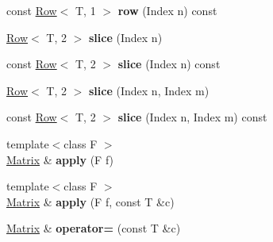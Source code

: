 \begin{DoxyCompactItemize}
\item 
const \hyperlink{classcpt_1_1Row}{Row}$<$ T, 1 $>$ {\bfseries row} (Index n) const \hypertarget{classcpt_1_1Matrix_3_01T_00_012_01_4_a0596d7c5a4bbe25667afb198df6a65f7}{}\label{classcpt_1_1Matrix_3_01T_00_012_01_4_a0596d7c5a4bbe25667afb198df6a65f7}

\item 
\hyperlink{classcpt_1_1Row}{Row}$<$ T, 2 $>$ {\bfseries slice} (Index n)\hypertarget{classcpt_1_1Matrix_3_01T_00_012_01_4_a36f5d189be30105ebc8cba82d10d2f9a}{}\label{classcpt_1_1Matrix_3_01T_00_012_01_4_a36f5d189be30105ebc8cba82d10d2f9a}

\item 
const \hyperlink{classcpt_1_1Row}{Row}$<$ T, 2 $>$ {\bfseries slice} (Index n) const \hypertarget{classcpt_1_1Matrix_3_01T_00_012_01_4_ad73b747e4db1bad9a817f2fd3ffd04bc}{}\label{classcpt_1_1Matrix_3_01T_00_012_01_4_ad73b747e4db1bad9a817f2fd3ffd04bc}

\item 
\hyperlink{classcpt_1_1Row}{Row}$<$ T, 2 $>$ {\bfseries slice} (Index n, Index m)\hypertarget{classcpt_1_1Matrix_3_01T_00_012_01_4_a00e278f8444c82a5c8275ec1cf62304e}{}\label{classcpt_1_1Matrix_3_01T_00_012_01_4_a00e278f8444c82a5c8275ec1cf62304e}

\item 
const \hyperlink{classcpt_1_1Row}{Row}$<$ T, 2 $>$ {\bfseries slice} (Index n, Index m) const \hypertarget{classcpt_1_1Matrix_3_01T_00_012_01_4_a45a01199431739330f1cd9f356cc65db}{}\label{classcpt_1_1Matrix_3_01T_00_012_01_4_a45a01199431739330f1cd9f356cc65db}

\item 
{\footnotesize template$<$class F $>$ }\\\hyperlink{classcpt_1_1Matrix}{Matrix} \& {\bfseries apply} (F f)\hypertarget{classcpt_1_1Matrix_3_01T_00_012_01_4_a53c9402d9b4c48243443c3a49245f14f}{}\label{classcpt_1_1Matrix_3_01T_00_012_01_4_a53c9402d9b4c48243443c3a49245f14f}

\item 
{\footnotesize template$<$class F $>$ }\\\hyperlink{classcpt_1_1Matrix}{Matrix} \& {\bfseries apply} (F f, const T \&c)\hypertarget{classcpt_1_1Matrix_3_01T_00_012_01_4_add8f0f8fe7315bc9f942700d8fef873a}{}\label{classcpt_1_1Matrix_3_01T_00_012_01_4_add8f0f8fe7315bc9f942700d8fef873a}

\item 
\hyperlink{classcpt_1_1Matrix}{Matrix} \& {\bfseries operator=} (const T \&c)\hypertarget{classcpt_1_1Matrix_3_01T_00_012_01_4_a40b51ef9b3851177cceaa505cd9648b0}{}\label{classcpt_1_1Matrix_3_01T_00_012_01_4_a40b51ef9b3851177cceaa505cd9648b0}


\end{DoxyCompactItemize}
